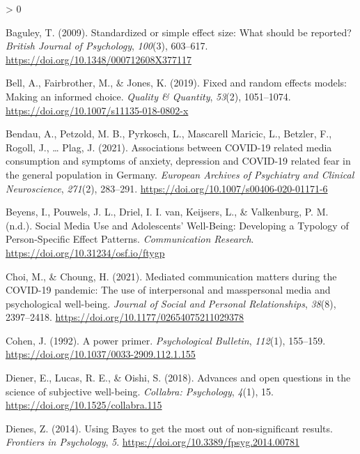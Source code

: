 \documentclass[
  english,
  man,mask,floatsintext]{apa6}
\newlength{\cslhangindent}
\newenvironment{CSLReferences}[2] %
 {%
  \setlength{\parindent}{0pt}
  \ifodd #1 \everypar{\setlength{\hangindent}{\cslhangindent}}\ignorespaces\fi
  \ifnum #2 > 0
  \setlength{\parskip}{#2\baselineskip}
  \fi
 }%
 {}
\begin{document}
\hypertarget{refs}{}
\begin{CSLReferences}{1}{0}
\leavevmode\hypertarget{ref-baguleyStandardizedSimpleEffect2009}{}%
Baguley, T. (2009). Standardized or simple effect size: {What} should be reported? \emph{British Journal of Psychology}, \emph{100}(3), 603--617. \url{https://doi.org/10.1348/000712608X377117}

\leavevmode\hypertarget{ref-bellFixedRandomEffects2019}{}%
Bell, A., Fairbrother, M., \& Jones, K. (2019). Fixed and random effects models: Making an informed choice. \emph{Quality \& Quantity}, \emph{53}(2), 1051--1074. \url{https://doi.org/10.1007/s11135-018-0802-x}

\leavevmode\hypertarget{ref-bendauAssociationsCOVID19Related2021}{}%
Bendau, A., Petzold, M. B., Pyrkosch, L., Mascarell Maricic, L., Betzler, F., Rogoll, J., \ldots{} Plag, J. (2021). Associations between {COVID}-19 related media consumption and symptoms of anxiety, depression and {COVID}-19 related fear in the general population in {Germany}. \emph{European Archives of Psychiatry and Clinical Neuroscience}, \emph{271}(2), 283--291. \url{https://doi.org/10.1007/s00406-020-01171-6}

\leavevmode\hypertarget{ref-beyensSocialMediaUseinpress}{}%
Beyens, I., Pouwels, J. L., Driel, I. I. van, Keijsers, L., \& Valkenburg, P. M. (n.d.). Social {Media} {Use} and {Adolescents}' {Well}-{Being}: {Developing} a {Typology} of {Person}-{Specific} {Effect} {Patterns}. \emph{Communication Research}. \url{https://doi.org/10.31234/osf.io/ftygp}

\leavevmode\hypertarget{ref-choiMediatedCommunicationMatters2021}{}%
Choi, M., \& Choung, H. (2021). Mediated communication matters during the {COVID}-19 pandemic: {The} use of interpersonal and masspersonal media and psychological well-being. \emph{Journal of Social and Personal Relationships}, \emph{38}(8), 2397--2418. \url{https://doi.org/10.1177/02654075211029378}

\leavevmode\hypertarget{ref-cohenPowerPrimer1992}{}%
Cohen, J. (1992). A power primer. \emph{Psychological Bulletin}, \emph{112}(1), 155--159. \url{https://doi.org/10.1037/0033-2909.112.1.155}

\leavevmode\hypertarget{ref-dienerAdvancesOpenQuestions2018}{}%
Diener, E., Lucas, R. E., \& Oishi, S. (2018). Advances and open questions in the science of subjective well-being. \emph{Collabra: Psychology}, \emph{4}(1), 15. \url{https://doi.org/10.1525/collabra.115}

\leavevmode\hypertarget{ref-dienesUsingBayesGet2014}{}%
Dienes, Z. (2014). Using {Bayes} to get the most out of non-significant results. \emph{Frontiers in Psychology}, \emph{5}. \url{https://doi.org/10.3389/fpsyg.2014.00781}


\end{CSLReferences}
\end{document}
